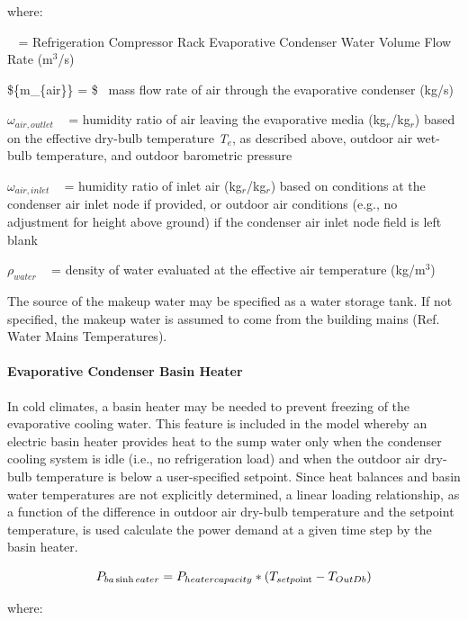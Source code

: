 where:

\(\mathop {{{\dot V}_{evaporation,makeup}}}\limits^{}\) = Refrigeration Compressor Rack Evaporative Condenser Water Volume Flow Rate (m\(^{3}\)/s)

\$\{\dot m\_\{air\}\} = \$ ~mass flow rate of air through the evaporative condenser (kg/s)

\({\omega_{air,outlet}}\) ~ = humidity ratio of air leaving the evaporative media (kg\(_{r}\)/kg\(_{r}\)) based on the effective dry-bulb temperature \emph{T\(_{e}\)}, as described above, outdoor air wet-bulb temperature, and outdoor barometric pressure

\({\omega_{air,inlet}}\) ~ = humidity ratio of inlet air (kg\(_{r}\)/kg\(_{r}\)) based on conditions at the condenser air inlet node if provided, or outdoor air conditions (e.g., no adjustment for height above ground) if the condenser air inlet node field is left blank

\({\rho_{water}}\) ~ = density of water evaluated at the effective air temperature (kg/m\(^{3}\))

The source of the makeup water may be specified as a water storage tank. If not specified, the makeup water is assumed to come from the building mains (Ref. Water Mains Temperatures).

\paragraph{Evaporative Condenser Basin Heater}\label{evaporative-condenser-basin-heater}

In cold climates, a basin heater may be needed to prevent freezing of the evaporative cooling water. This feature is included in the model whereby an electric basin heater provides heat to the sump water only when the condenser cooling system is idle (i.e., no refrigeration load) and when the outdoor air dry-bulb temperature is below a user-specified setpoint. Since heat balances and basin water temperatures are not explicitly determined, a linear loading relationship, as a function of the difference in outdoor air dry-bulb temperature and the setpoint temperature, is used calculate the power demand at a given time step by the basin heater.

\begin{equation}
{P_{ba\sinh eater}} = {P_{heatercapacity}}*({T_{setpo{\mathop{\rm int}} }} - {T_{OutDb}})
\end{equation}

where:

